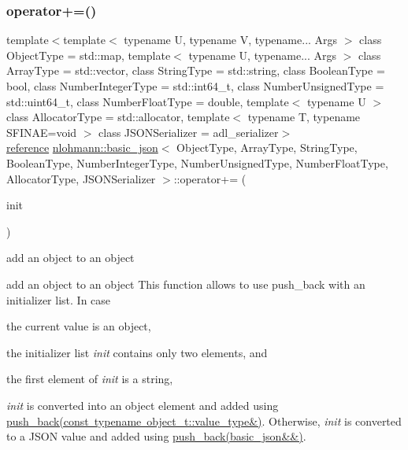 \subsubsection{\texorpdfstring{operator+=()}{operator+=()}\hspace{0.1cm}{\footnotesize\ttfamily [4/4]}}
{\footnotesize\ttfamily template$<$template$<$ typename U, typename V, typename... Args $>$ class Object\+Type = std\+::map, template$<$ typename U, typename... Args $>$ class Array\+Type = std\+::vector, class String\+Type  = std\+::string, class Boolean\+Type  = bool, class Number\+Integer\+Type  = std\+::int64\+\_\+t, class Number\+Unsigned\+Type  = std\+::uint64\+\_\+t, class Number\+Float\+Type  = double, template$<$ typename U $>$ class Allocator\+Type = std\+::allocator, template$<$ typename T, typename S\+F\+I\+N\+A\+E=void $>$ class J\+S\+O\+N\+Serializer = adl\+\_\+serializer$>$ \\
\mbox{\hyperlink{classnlohmann_1_1basic__json_ac6a5eddd156c776ac75ff54cfe54a5bc}{reference}} \mbox{\hyperlink{classnlohmann_1_1basic__json}{nlohmann\+::basic\+\_\+json}}$<$ Object\+Type, Array\+Type, String\+Type, Boolean\+Type, Number\+Integer\+Type, Number\+Unsigned\+Type, Number\+Float\+Type, Allocator\+Type, J\+S\+O\+N\+Serializer $>$\+::operator+= (\begin{DoxyParamCaption}\item[{std\+::initializer\+\_\+list$<$ \mbox{\hyperlink{classnlohmann_1_1basic__json}{basic\+\_\+json}}$<$ Object\+Type, Array\+Type, String\+Type, Boolean\+Type, Number\+Integer\+Type, Number\+Unsigned\+Type, Number\+Float\+Type, Allocator\+Type, J\+S\+O\+N\+Serializer $>$ $>$}]{init }\end{DoxyParamCaption})\hspace{0.3cm}{\ttfamily [inline]}}



add an object to an object 

add an object to an object This function allows to use {\ttfamily push\+\_\+back} with an initializer list. In case


\begin{DoxyEnumerate}
\item the current value is an object,
\item the initializer list {\itshape init} contains only two elements, and
\item the first element of {\itshape init} is a string,
\end{DoxyEnumerate}

{\itshape init} is converted into an object element and added using \mbox{\hyperlink{classnlohmann_1_1basic__json_ae11a3a51782c058fff2f6550cdfb9b3c}{push\+\_\+back(const typename object\+\_\+t\+::value\+\_\+type\&)}}. Otherwise, {\itshape init} is converted to a J\+S\+ON value and added using \mbox{\hyperlink{classnlohmann_1_1basic__json_ac8e523ddc8c2dd7e5d2daf0d49a9c0d7}{push\+\_\+back(basic\+\_\+json\&\&)}}.


